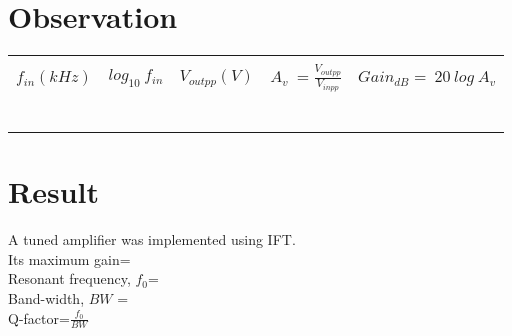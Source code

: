 \section*{Observation}
\begin{center}

\begin{tabular}{|l|l|l|l|l|}

\hline
  & & & &\\
 
$f_{in} (kHz) $  & $log_{10}\ f_{in}$  &  $V_{outpp}(V)$ & $A_v\ =\frac{V_{outpp}}{V_{inpp}} $ & $Gain_{dB}=\ 20\ log\ A_v$ \\ \hline
 & & & &\\ \hline
& & & &\\ \hline
& & & &\\ \hline
& & & &\\ \hline
& & & &\\ \hline
& & & &\\ \hline

\end{tabular}
\end{center}
\section*{Result}
A tuned amplifier was implemented using IFT.\\
Its maximum gain= \\
Resonant frequency, $f_0$= \\
Band-width, $BW$ =\\
Q-factor=$\frac{f_0}{BW}$
